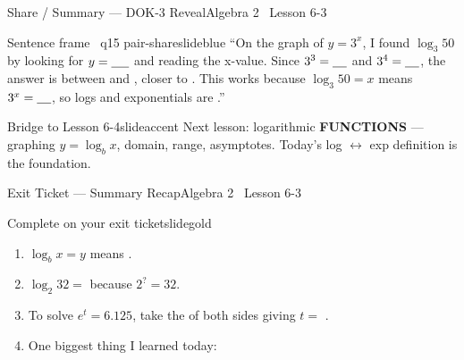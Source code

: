 \documentclass[aspectratio=169, 11pt]{beamer}
\begin{document}
\begin{frame}{Share / Summary --- DOK-3 Reveal}{Algebra 2 \textperiodcentered\ Lesson 6-3}
\vspace{0.2cm}
\begin{projcard}{Sentence frame \textperiodcentered\ q15 pair-share}{slideblue}
``On the graph of \(y = 3^x\), I found \(\log_3 50\) by looking for \(y = \underline{\hspace{0.5cm}}\) and reading the x-value.
Since \(3^3 = \underline{\hspace{0.4cm}}\) and \(3^4 = \underline{\hspace{0.4cm}}\), the answer is between \underline{\hspace{0.4cm}} and \underline{\hspace{0.4cm}}, closer to \underline{\hspace{0.6cm}}.
This works because \(\log_3 50 = x\) means \(3^x = \underline{\hspace{0.4cm}}\), so logs and exponentials are \underline{\hspace{0.9cm}}.''
\end{projcard}

\vspace{0.15cm}
\begin{projcard}{Bridge to Lesson 6-4}{slideaccent}
Next lesson: logarithmic \textbf{FUNCTIONS} --- graphing \(y = \log_b x\), domain, range, asymptotes.
Today's log \(\leftrightarrow\) exp definition is the foundation.
\end{projcard}
\end{frame}

\begin{frame}{Exit Ticket --- Summary Recap}{Algebra 2 \textperiodcentered\ Lesson 6-3}
\vspace{0.2cm}
\begin{projcard}{Complete on your exit ticket}{slidegold}
\begin{enumerate}
  \setlength{\itemsep}{0.25cm}
  \item \(\log_b x = y\) means \underline{\hspace{4cm}}.
  \item \(\log_2 32 = \) \underline{\hspace{1cm}} because \(2^{?} = 32\).
  \item To solve \(e^t = 6.125\), take the \underline{\hspace{1.8cm}} of both sides giving \(t = \) \underline{\hspace{1.6cm}}.
  \item One biggest thing I learned today: \underline{\hspace{5cm}}
\end{enumerate}
\end{projcard}
\end{frame}
\end{document}
